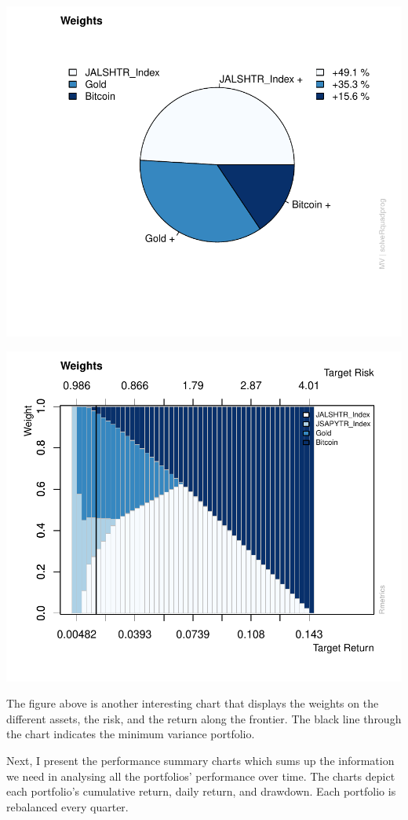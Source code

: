 \documentclass[11pt,preprint, authoryear]{elsarticle}
\numberwithin{equation}{section}
\numberwithin{figure}{section}
\numberwithin{table}{section}
\begin{document}
\includegraphics{FinMetrics-Essay_files/figure-latex/unnamed-chunk-22-1.pdf}

\includegraphics{FinMetrics-Essay_files/figure-latex/unnamed-chunk-23-1.pdf}

The figure above is another interesting chart that displays the weights
on the different assets, the risk, and the return along the frontier.
The black line through the chart indicates the minimum variance
portfolio.

Next, I present the performance summary charts which sums up the
information we need in analysing all the portfolios' performance over
time. The charts depict each portfolio's cumulative return, daily
return, and drawdown. Each portfolio is rebalanced every quarter.
\end{document}
